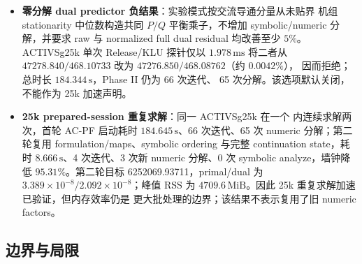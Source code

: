 \begin{itemize}
        合理方向。
  \item \textbf{零分解 dual predictor 负结果}：实验模式按交流导通分量从未贴界
        机组 stationarity 中位数构造共同 $P/Q$ 平衡乘子，不增加 symbolic/numeric
        分解，并要求 raw 与 normalized full dual residual 均改善至少 $5\%$。
        ACTIVSg25k 单次 Release/KLU 探针仅以 $1.978\,\mathrm{ms}$ 将二者从
        $47278.840/468.10733$ 改为 $47276.850/468.08762$（约 $0.0042\%$），
        因而拒绝；总时长 $184.344\,\mathrm{s}$，Phase II 仍为 66 次迭代、
        65 次分解。该选项默认关闭，不能作为 25k 加速声明。
  \item \textbf{25k prepared-session 重复求解}：同一 ACTIVSg25k 在一个
         内连续求解两次，首轮 AC-PF 启动耗时
        $184.645\,\mathrm{s}$、66 次迭代、65 次 numeric 分解；第二轮复用
        formulation/maps、symbolic ordering 与完整 continuation state，耗时
        $8.666\,\mathrm{s}$、4 次迭代、3 次新 numeric 分解、0 次 symbolic
        analyze，墙钟降低 $95.31\%$。第二轮目标 6252069.93711，primal/dual
        为 $3.389\times10^{-8}/2.092\times10^{-8}$；峰值 RSS 为
        $4709.6\,\mathrm{MiB}$。因此 25k 重复求解加速已验证，但内存效率仍是
        更大批处理的边界；该结果不表示复用了旧 numeric factors。
\end{itemize}

\subsection{边界与局限}\label{subsec:acopfnative:limitations}

